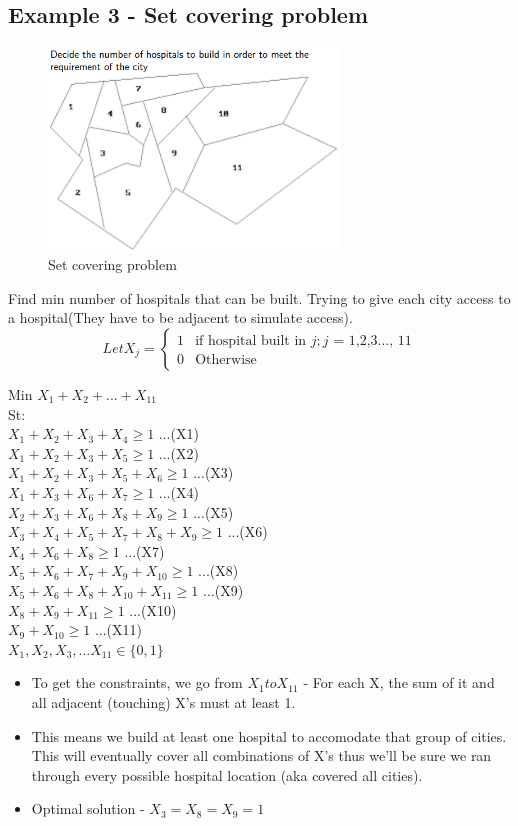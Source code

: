 \documentclass[12pt, a4paper]{article}
\begin{document}
\subsection*{Example 3 - Set covering problem}
\begin{figure}[ht]
    \centering
    \includegraphics*[width=0.69\textwidth]{example3}
    \caption{Set covering problem}
    \label{fig: Set covering problem}
\end{figure}
Find min number of hospitals that can be built. Trying to give each city access to a hospital(They have to be adjacent to simulate access).
\begin{equation}
   Let X_j =
  \begin{cases}
    1 & \text{if hospital built in $j; j$ = 1,2,3..., 11} \\
    0 & \text{Otherwise}
  \end{cases}
\end{equation}

Min $X_1+X_2+...+X_{11}$\\
St:\\
$X_1+X_2+X_3+X_4 \geq 1$  ...(X1)\\
$X_1+X_2+X_3+X_5 \geq 1$  ...(X2)\\
$X_1+X_2+X_3+X_5+X_6 \geq 1$  ...(X3)\\
$X_1+X_3+X_6+X_7 \geq 1$  ...(X4)\\
$X_2+X_3+X_6+X_8+X_9 \geq 1$  ...(X5)\\
$X_3+X_4+X_5+X_7+X_8+X_9 \geq 1$  ...(X6)\\
$X_4+X_6+X_8 \geq 1$  ...(X7)\\
$X_5+X_6+X_7+X_9+X_{10} \geq 1$  ...(X8)\\
$X_5+X_6+X_8+X_{10}+X_{11} \geq 1$  ...(X9)\\
$X_8+X_9+X_{11} \geq 1$  ...(X10)\\
$X_9+X_{10} \geq 1$  ...(X11)\\
$X_1, X_2, X_3, ... X_{11} \in \{0,1\} 
$
\begin{itemize}
    \item To get the constraints, we go from $X_1 to X_{11}$ - For each X, the sum of it and all adjacent (touching) X's must at least 1. 
    \item This means we build at least one hospital to accomodate that group of cities. This will eventually cover all combinations of X's thus we'll be sure we ran through every possible hospital location (aka covered all cities).
    \item Optimal solution - $X_3=X_8=X_9=1$
\end{itemize}
\end{document}
